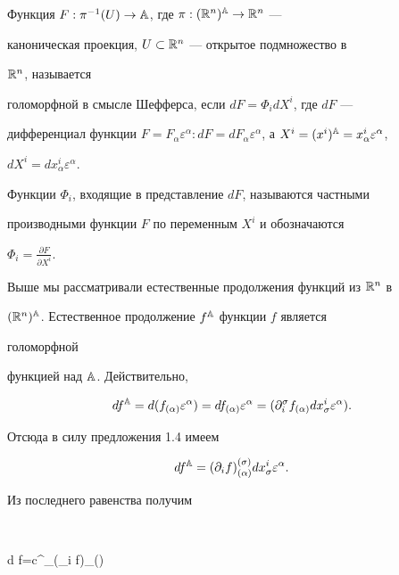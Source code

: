 \begin{defns} 


Функция $F:\pi^{-1}(U)\to\Bbb A$, где $\pi:(\Bbb R^n)^{\Bbb A}\to\Bbb R^n$ --- 


каноническая проекция, $U\subset\Bbb R^n$ --- открытое подмножество в 


$\Bbb R^n$, называется  


голоморфной в смысле Шефферса, если $dF=\Phi_i dX^i$, где $dF$ --- 


дифференциал функции $F=F_\alpha\varepsilon^\alpha:dF=dF_\alpha 


\varepsilon^\alpha$, а $X^i=(x^i)\A=x^i_\alpha\varepsilon^\alpha$, 


$dX^i=dx^i_\alpha\varepsilon^\alpha$. 


\end{defns} 


 


Функции $\Phi_i$, входящие в представление $dF$, называются частными 


производными функции $F$ по переменным $X^i$ и обозначаются 


$\Phi_i=\frac{\partial F}{\partial X^i}$. 


 


Выше мы рассматривали естественные продолжения функций из $\Bbb R^n$ в 


$(\Bbb R^n)^{\Bbb A}$. Естественное продолжение $f^{\Bbb A}$ функции $f$ является 


голоморфной  


функцией над $\Bbb A$. Действительно, 


$$ 


d f\A=d(f_{(\alpha)}\varepsilon^\alpha)=d f_{(\alpha)} 


\varepsilon^\alpha=(\partial^\sigma_i f_{(\alpha)} 


dx^i_\sigma\varepsilon^\alpha). 


$$ 


Отсюда в силу предложения 1.4 имеем 


$$ 


d f\A=(\partial_i f)^{(\sigma)}_{(\alpha)} 


dx^i_\sigma\varepsilon^\alpha. 


$$ 


Из последнего равенства получим 


$$ 


d f\A=c^{\sigma\tau}_\alpha(\partial_i f)_{(\tau)} 


